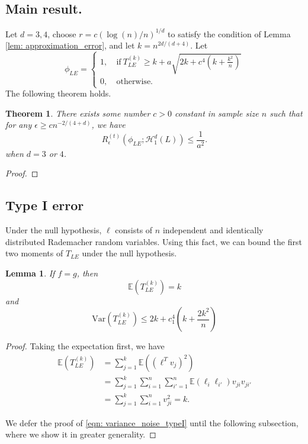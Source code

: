\documentclass{article}
\newcommand{\Var}{\mathrm{Var}}
\newcommand{\1}{\mathbb{I}}
\newcommand{\Hclass}{\mathcal{H}}
\newcommand{\Ebb}{\mathbb{E}}
\theoremstyle{alden}
\theoremstyle{aldenthm}
\newtheorem{theorem}{Theorem}
\newtheorem{lemma}{Lemma}
\theoremstyle{definition}
\theoremstyle{remark}
\begin{document}
\subsection{Main result.}
Let $d = 3,4$, choose $r = c(\log(n)/n)^{1/d}$ to satisfy the condition of Lemma \ref{lem: approximation_error}, and let $k = n^{2d/(d + 4)}$. Let 
\begin{equation*}
\phi_{LE} =
\begin{cases}
1,~ & \text{if}~ T_{LE}^{(k)} \geq k + a\sqrt{2k + c^4\left(k + \frac{k^2}{n}\right)} \\
0,~ & \text{otherwise}.
\end{cases}
\end{equation*}
The following theorem holds.
\begin{theorem}
	There exists some number $c > 0$ constant in sample size $n$ such that for any $\epsilon \geq c n^{-2/(4 + d)}$, we have
	\begin{equation*}
	R_{\epsilon}^{(t)}(\phi_{LE}; \Hclass_1^{d}(L)) \leq \frac{1}{a^2}.
	\end{equation*}
	when $d = 3$ or $4$. 
\end{theorem}
\begin{proof}
	
\end{proof}

\subsection{Type I error}

Under the null hypothesis, $\ell$ consists of $n$ independent and identically distributed Rademacher random variables. Using this fact, we can bound the first two moments of $T_{LE}$ under the null hypothesis.

\begin{lemma}
	If $f = g$, then
	\begin{equation}
	\Ebb(T_{LE}^{(k)}) = k
	\end{equation}
	and
	\begin{equation}
	\label{eqn: variance_noise_typeI}
	\Var(T_{LE}^{(k)}) \leq 2k + c_1^4\left(k + \frac{2k^2}{n}\right)
	\end{equation}
\end{lemma}
\begin{proof}
	Taking the expectation first, we have
	\begin{align*}
	\Ebb(T_{LE}^{(k)}) & = \sum_{j = 1}^{k} \Ebb((\ell^T v_j)^2) \\
	& = \sum_{j = 1}^{k} \sum_{i = 1}^{n} \sum_{i' = 1}^{n} \Ebb(\ell_i \ell_{i'}) v_{ji} v_{ji'} \\
	& =  \sum_{j = 1}^{k} \sum_{i = 1}^{n} v_{ji}^2 = k.
	\end{align*}
	
	We defer the proof of \eqref{eqn: variance_noise_typeI} until the following subsection, where we show it in greater generality.
\end{proof}
\end{document}
